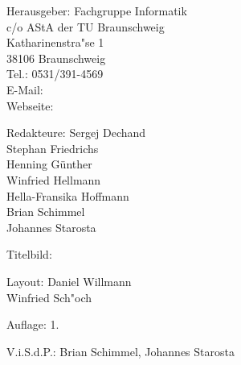 
\begin{nimpressum}
\item[Herausgeber:]
	Fachgruppe Informatik\\
	c/o AStA der TU Braunschweig\\
	Katharinenstra"se 1\\
	38106 Braunschweig\\
	Tel.: 0531/391-4569\\
	E-Mail: \\
	Webseite: 
      \item[Redakteure:]
        Sergej Dechand\\
	Stephan Friedrichs\\
        Henning Günther\\
        Winfried Hellmann\\
        Hella-Fransika Hoffmann\\
        Brian Schimmel\\
        Johannes Starosta
\item[Titelbild:]
\item[Layout:]
	Daniel Willmann\\
	Winfried Sch"och

%
\item[Auflage:]
  1.
\item[V.i.S.d.P.:]  %
  Brian Schimmel, Johannes Starosta
\end{nimpressum}

